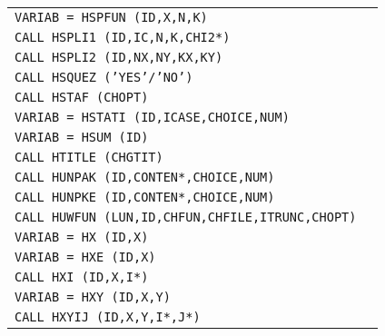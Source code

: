 \begin{longtable}{|>{\tt}p{.9\linewidth}r|}
VARIAB = HSPFUN (ID,X,N,K)                   
&                                                       \pageref{HSPFUN} \\
CALL     HSPLI1 (ID,IC,N,K,CHI2*)            
&                                                       \pageref{HSPLI1} \\
CALL     HSPLI2 (ID,NX,NY,KX,KY)             
&                                                       \pageref{HSPLI2} \\
CALL     HSQUEZ ('YES'/'NO')                 
&                                                       \pageref{HSQUEZ} \\
CALL     HSTAF  (CHOPT)                 
&                                                       \pageref{HSTAF}  \\
VARIAB = HSTATI (ID,ICASE,CHOICE,NUM)        
&                                                       \pageref{HSTATI} \\
VARIAB = HSUM   (ID)                         
&                                                       \pageref{HSUM}   \\
CALL     HTITLE (CHGTIT)                     
&                                                       \pageref{HTITLE} \\
CALL     HUNPAK (ID,CONTEN*,CHOICE,NUM)      
&                                                       \pageref{HUNPAK} \\
CALL     HUNPKE (ID,CONTEN*,CHOICE,NUM)      
&                                                       \pageref{HUNPKE} \\
CALL     HUWFUN (LUN,ID,CHFUN,CHFILE,ITRUNC,CHOPT)
&                                                       \pageref{HUWFUN} \\
VARIAB = HX    (ID,X)                        
&                                                       \pageref{HX}     \\
VARIAB = HXE    (ID,X)                       
&                                                       \pageref{HXE}    \\
CALL     HXI    (ID,X,I*)                    
&                                                       \pageref{HXI}    \\
VARIAB = HXY    (ID,X,Y)                     
&                                                       \pageref{HXY}    \\
CALL     HXYIJ  (ID,X,Y,I*,J*)               
&                                                       \pageref{HXYIJ}  \\
\end{longtable}

